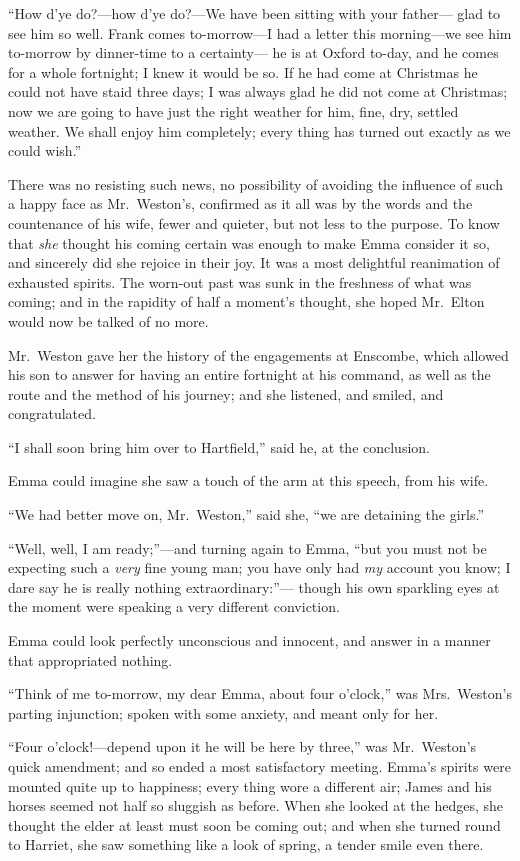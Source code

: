 ``How d'ye do?---how d'ye do?---We have been sitting with your father---%
glad to see him so well.  Frank comes to-morrow---I had a letter
this morning---we see him to-morrow by dinner-time to a certainty---%
he is at Oxford to-day, and he comes for a whole fortnight; I knew it would
be so.  If he had come at Christmas he could not have staid three days;
I was always glad he did not come at Christmas; now we are going
to have just the right weather for him, fine, dry, settled weather.
We shall enjoy him completely; every thing has turned out exactly
as we could wish.''

There was no resisting such news, no possibility of avoiding the
influence of such a happy face as Mr.\ Weston's, confirmed as it all
was by the words and the countenance of his wife, fewer and quieter,
but not less to the purpose.  To know that \emph{she} thought his coming
certain was enough to make Emma consider it so, and sincerely did
she rejoice in their joy.  It was a most delightful reanimation
of exhausted spirits.  The worn-out past was sunk in the freshness
of what was coming; and in the rapidity of half a moment's thought,
she hoped Mr.\ Elton would now be talked of no more.

Mr.\ Weston gave her the history of the engagements at Enscombe,
which allowed his son to answer for having an entire fortnight at
his command, as well as the route and the method of his journey;
and she listened, and smiled, and congratulated.

``I shall soon bring him over to Hartfield,'' said he, at the conclusion.

Emma could imagine she saw a touch of the arm at this speech,
from his wife.

``We had better move on, Mr.\ Weston,'' said she, ``we are detaining
the girls.''

``Well, well, I am ready;''---and turning again to Emma, ``but you must
not be expecting such a \emph{very} fine young man; you have only had \emph{my}
account you know; I dare say he is really nothing extraordinary:''---%
though his own sparkling eyes at the moment were speaking a very
different conviction.

Emma could look perfectly unconscious and innocent, and answer
in a manner that appropriated nothing.

``Think of me to-morrow, my dear Emma, about four o'clock,''
was Mrs.\ Weston's parting injunction; spoken with some anxiety,
and meant only for her.

``Four o'clock!---depend upon it he will be here by three,'' was Mr.\ Weston's
quick amendment; and so ended a most satisfactory meeting.
Emma's spirits were mounted quite up to happiness; every thing wore
a different air; James and his horses seemed not half so sluggish
as before.  When she looked at the hedges, she thought the elder at
least must soon be coming out; and when she turned round to Harriet,
she saw something like a look of spring, a tender smile even there.

